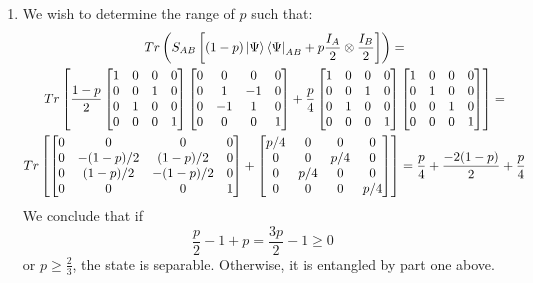 \documentclass[12pt]{article}%
\begin{document}
\begin{enumerate}
    \item We wish to determine the range of $p$ such that:
    \begin{gather*}
      Tr \left(S_{AB}\left[(1-p)\ket{\Psi}\bra{\Psi}_{AB} + p\frac{I_A}{2} \otimes\frac{I_B}{2}\right] \right) = \\
      Tr \left[\frac{1-p}{2}
      \left[\begin{matrix}
      1 & 0 & 0 & 0 \\
      0 & 0 & 1 & 0 \\
      0 & 1 & 0 & 0 \\
      0 & 0 & 0 & 1 \\
      \end{matrix}\right]
      \left[\begin{matrix}
      0 & 0 & 0 & 0 \\
      0 & 1 & -1 & 0 \\
      0 & -1 & 1 & 0 \\
      0 & 0 & 0 & 1 \\
      \end{matrix}\right] +
      \frac{p}{4}
      \left[\begin{matrix}
      1 & 0 & 0 & 0 \\
      0 & 0 & 1 & 0 \\
      0 & 1 & 0 & 0 \\
      0 & 0 & 0 & 1 \\
      \end{matrix}\right]
      \left[\begin{matrix}
      1 & 0 & 0 & 0 \\
      0 & 1 & 0 & 0 \\
      0 & 0 & 1 & 0 \\
      0 & 0 & 0 & 1 \\
      \end{matrix}\right]
      \right] = \\
      Tr \left[
      \left[\begin{matrix}
      0 & 0 & 0 & 0 \\
      0 & -(1-p)/2 & (1-p)/2 & 0 \\
      0 & (1-p)/2 & -(1-p)/2 & 0 \\
      0 & 0 & 0 & 1 \\
      \end{matrix}\right] +
      \left[\begin{matrix}
      p/4 & 0 & 0 & 0 \\
      0 & 0 & p/4 & 0 \\
      0 & p/4 & 0 & 0 \\
      0 & 0 & 0 & p/4 \\
      \end{matrix}\right]
      \right] =
      \frac{p}{4} + \frac{-2(1-p)}{2} +\frac{p}{4}
    \end{gather*}
    We conclude that if $$\frac{p}{2} - 1 + p = \frac{3p}{2} - 1\geq 0 $$
    or $p \geq \frac{2}{3}$, the state is separable. Otherwise, it is entangled by part one above.
  \end{enumerate}
\end{document}
